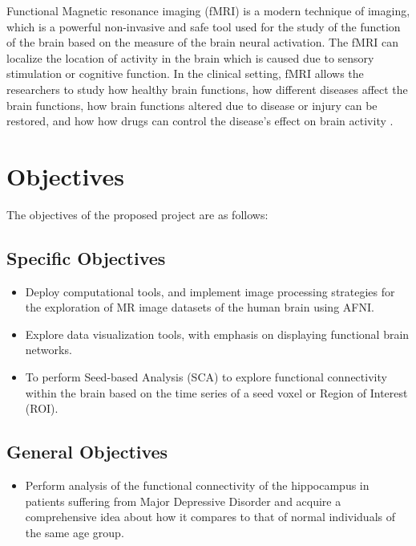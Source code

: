 \documentclass{article}
\begin{document}
\vspace{-10pt}
\enlargethispage{\baselineskip}
Functional Magnetic resonance imaging (fMRI) is a modern technique of
imaging, which is a powerful non-invasive and safe tool used for the
study of the function of the brain based on the measure of the brain
neural activation. The fMRI can localize the location of activity in
the  brain  which  is  caused  due  to sensory stimulation or
cognitive  function. In the clinical setting, fMRI allows the
researchers to study how healthy brain functions, how different
diseases affect the brain functions, how brain functions altered due
to disease or injury can be restored, and how how drugs can control
the disease's effect on brain activity \cite{fMRI}.

\newpage

\section{Objectives}

The objectives of the proposed project are as follows:

\subsection{Specific Objectives}

\begin{itemize}

  \item Deploy computational tools, and implement image processing
        strategies for the exploration of MR image datasets of the
        human brain using AFNI.

  \item Explore data visualization tools, with emphasis on displaying
        functional brain networks.

  \item To perform Seed-based Analysis (SCA) to explore functional
        connectivity within the brain based on the time series of a seed
        voxel or Region of Interest (ROI).

\end{itemize}

\subsection{General Objectives}

\begin{itemize}

  \item Perform analysis of the functional connectivity of the
      hippocampus in patients suffering from Major Depressive Disorder
      and acquire a comprehensive idea about how it compares to that
      of normal individuals of the same age group.

\end{itemize}
\end{document}
